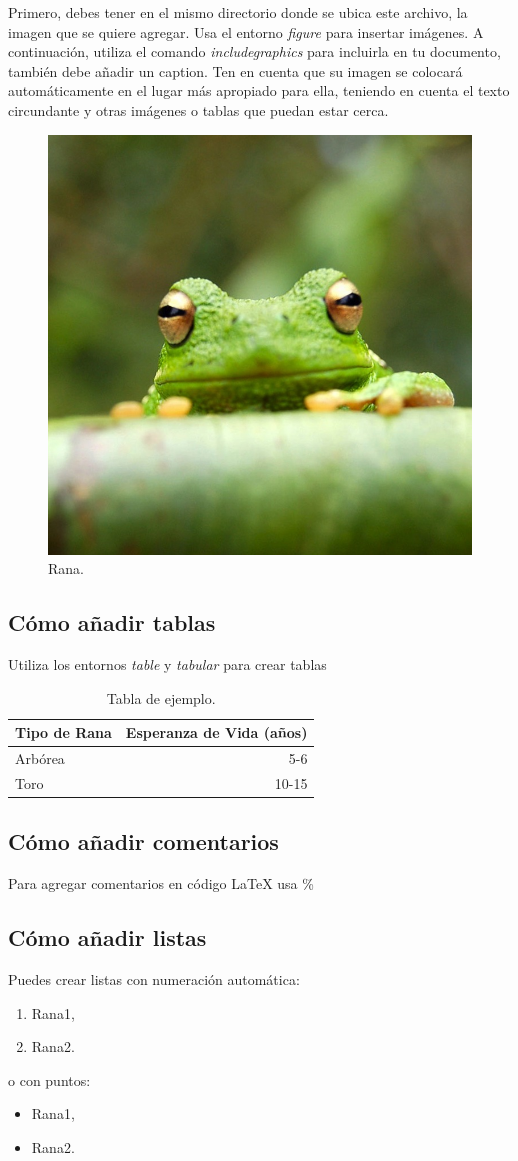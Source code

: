 \documentclass{article}
\begin{document}
Primero, debes tener en el mismo directorio donde se ubica este archivo, la imagen que se quiere agregar. Usa el entorno \emph{figure} para insertar imágenes. A continuación, utiliza el comando \emph{includegraphics} para incluirla en tu documento, también debe añadir un caption.
Ten en cuenta que su imagen se colocará automáticamente en el lugar más apropiado para ella, teniendo en cuenta el texto circundante y otras imágenes o tablas que puedan estar cerca.

\begin{figure}
\centering
\includegraphics[width=0.25\linewidth]{frog.jpg}
\caption{\label{fig:frog}Rana.}
\end{figure}

\subsection{Cómo añadir tablas}

Utiliza los entornos \emph{table} y \emph{tabular} para crear tablas

\begin{table}
\centering
\begin{tabular}{l|r}
Tipo de Rana & Esperanza de Vida (años) \\\hline
Arbórea & 5-6  \\
Toro & 10-15
\end{tabular}
\caption{\label{tab:widgets}Tabla de ejemplo.}
\end{table}

\subsection{Cómo añadir comentarios}

Para agregar comentarios en código LaTeX usa \%

\subsection{Cómo añadir listas}

Puedes crear listas con numeración automática:

\begin{enumerate}
\item Rana1,
\item Rana2.
\end{enumerate}
o con puntos:
\begin{itemize}
\item Rana1,
\item Rana2.
\end{itemize}
\end{document}
